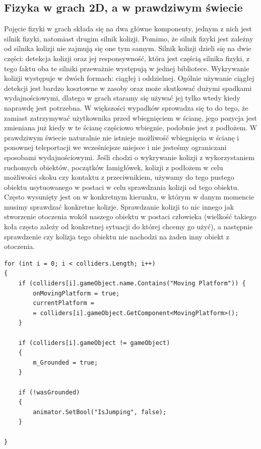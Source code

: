 \documentclass[oneside,polski,logo]{amuthesis}
\begin{document}
\subsection{Fizyka w grach 2D, a w prawdziwym świecie}
 Pojęcie fizyki w grach składa się na dwa główne komponenty, jednym z nich jest silnik fizyki, natomiast drugim silnik kolizji. Pomimo, że silnik fizyki jest zależny od silnika kolizji nie zajmują się one tym samym.
Silnik kolizji dzieli się na dwie części: detekcja kolizji oraz jej responsywność, która jest częścią silnika fizyki, z tego faktu oba te silniki przeważnie występują w jednej bibliotece. Wykrywanie kolizji występuje w dwóch formach: ciągłej i oddzielnej. Ogólnie używanie ciągłej detekcji jest bardzo kosztowne w zasoby oraz może skutkować dużymi spadkami wydajnościowymi, dlatego w grach staramy się używać jej tylko wtedy kiedy naprawdę jest potrzebna. W większości wypadków sprowadza się to do tego, że zamiast zatrzymywać użytkownika przed wbiegnięciem w ścianę, jego pozycja jest zmieniana już kiedy w te ścianę częściowo wbiegnie, podobnie jest z podłożem. W prawdziwym świecie naturalnie nie istnieje możliwość wbiegnięcia w ścianę i ponownej teleportacji we wcześniejsze miejsce i nie jesteśmy ograniczani sposobami wydajnościowymi. Jeśli chodzi o wykrywanie kolizji z wykorzystaniem ruchomych obiektów, początków łamigłówek, kolizji z podłożem w celu możliwości skoku czy kontaktu z przeciwnikiem, używamy do tego pustego obiektu usytuowanego w postaci w celu sprawdzania kolizji od tego obiektu. Często wysunięty jest on w konkretnym kierunku, w którym w danym momencie musimy sprawdzać konkretne kolizje. Sprawdzanie kolizji to nic innego jak stworzenie otoczenia wokół naszego obiektu w postaci człowieka (wielkość takiego koła często zależy od konkretnej sytuacji do której chcemy go użyć), a następnie sprawdzenie czy kolizja tego obiektu nie nachodzi na żaden inny obiekt z otoczenia. \cite{physics1}

\begin{lstlisting}[breaklines=true,
language={[Sharp]C},
rulecolor=\color{blue!80!black},
caption={Fragment klasy \texttt{CharacterController.cs}}
]
for (int i = 0; i < colliders.Length; i++)
{
	if (colliders[i].gameObject.name.Contains("Moving Platform")) {
		onMovingPlatform = true;
		currentPlatform = 
		= colliders[i].gameObject.GetComponent<MovingPlatform>();
	}

	if (colliders[i].gameObject != gameObject)
	{
		m_Grounded = true;
	}

	if (!wasGrounded)
	{
		animator.SetBool("IsJumping", false);
	}

}
\end{lstlisting}
\end{document}
